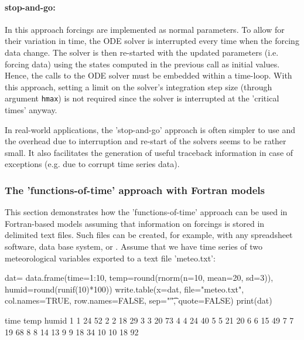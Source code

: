 \documentclass[times,onecolumn]{article}
\begin{document}
\paragraph{stop-and-go:} In this approach forcings are implemented as normal parameters. To allow for their variation in time, the ODE solver is interrupted every time when the forcing data change. The solver is then re-started with the updated parameters (i.e. forcing data) using the states computed in the previous call as initial values. Hence, the calls to the ODE solver must be embedded within a time-loop. With this approach, setting a limit on the solver's integration step size (through argument \verb|hmax|) is not required since the solver is interrupted at the 'critical times' anyway.

In real-world applications, the 'stop-and-go' approach is often simpler to use and the overhead due to interruption and re-start of the solvers seems to be rather small. It also facilitates the generation of useful traceback information in case of exceptions (e.g. due to corrupt time series data).

\subsubsection{The 'functions-of-time' approach with Fortran models}

This section demonstrates how the 'functions-of-time' approach can be used in Fortran-based models assuming that information on forcings is stored in delimited text files. Such files can be created, for example, with any spreadsheet software, data base system, or . Assume that we have time series of two meteorological variables exported to a text file 'meteo.txt':

\begin{Schunk}
\begin{Sinput}
 dat= data.frame(time=1:10, temp=round(rnorm(n=10, mean=20, sd=3)),
   humid=round(runif(10)*100))
 write.table(x=dat, file="meteo.txt", col.names=TRUE,
   row.names=FALSE, sep="\t", quote=FALSE)
 print(dat)
\end{Sinput}
\begin{Soutput}
   time temp humid
1     1   24    52
2     2   18    29
3     3   20    73
4     4   24    40
5     5   21    20
6     6   15    49
7     7   19    68
8     8   14    13
9     9   18    34
10   10   18    92
\end{Soutput}
\end{Schunk}
\end{document}
